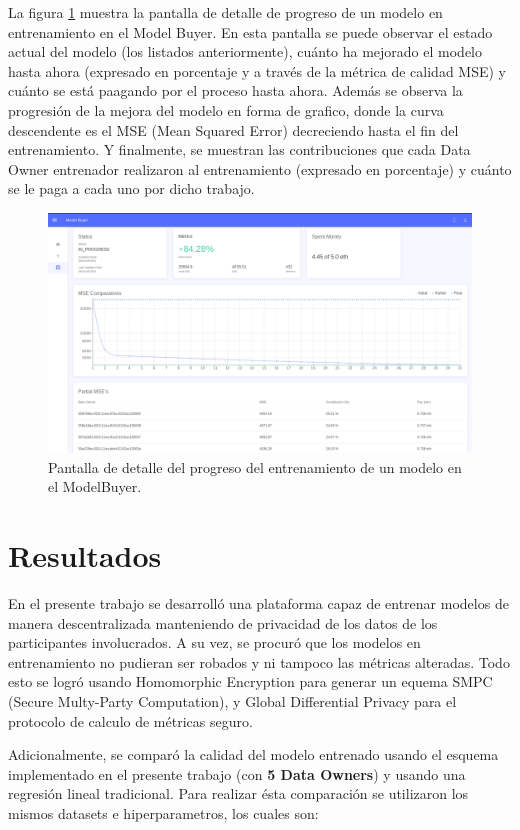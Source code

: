\documentclass[
11pt, %
oneside, %
spanish, %
singlespacing, %
parskip, %
headsepline, %
chapterinoneline, %
]{MastersDoctoralThesis} %
\begin{document}
La figura \ref{fig:model_progress} muestra la pantalla de detalle de progreso de un modelo en entrenamiento en el Model Buyer. En esta pantalla se puede observar el estado actual del modelo (los listados anteriormente), cuánto ha mejorado el modelo hasta ahora (expresado en porcentaje y a través de la métrica de calidad MSE) y cuánto se está paagando por el proceso hasta ahora.
Además se observa la progresión de la mejora del modelo en forma de grafico, donde la curva descendente es el MSE (Mean Squared Error) decreciendo hasta el fin del entrenamiento. Y finalmente, se muestran las contribuciones que cada Data Owner entrenador realizaron al entrenamiento (expresado en porcentaje) y cuánto se le paga a cada uno por dicho trabajo.

\begin{figure}[H]
  	\centering
	\includegraphics[scale=0.3]{imgs/ModelProgress.png}
	\caption{Pantalla de detalle del progreso del entrenamiento de un modelo en el ModelBuyer.}
	\label{fig:model_progress}
\end{figure}

\chapter{Resultados}

En el presente trabajo se desarrolló una plataforma capaz de entrenar modelos de manera descentralizada manteniendo de privacidad de los datos de los participantes involucrados. A su vez, se procuró que los modelos en entrenamiento no pudieran ser robados y ni tampoco las métricas alteradas. Todo esto se logró usando Homomorphic Encryption para generar un equema SMPC (Secure Multy-Party Computation), y Global Differential Privacy para el protocolo de calculo de métricas seguro.

Adicionalmente, se comparó la calidad del modelo entrenado usando el esquema implementado en el presente trabajo (con \textbf{5 Data Owners}) y usando una regresión lineal tradicional. Para realizar ésta comparación se utilizaron los mismos datasets e hiperparametros, los cuales son:
\end{document}
